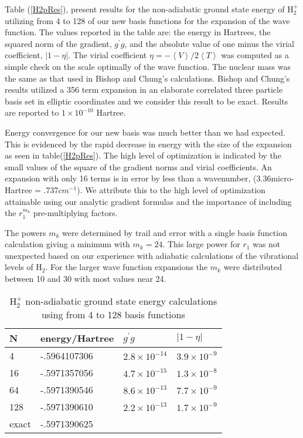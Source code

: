 \documentclass[12pt,doublespace]{article}
\begin{document}
Table (\ref{H2pRes}),  present results for the non-adiabatic ground state
energy of H$_{2}^{+}$ utilizing from 4 to 128 of our new basis functions for
the expansion of the wave function.  The values reported in the table are:
the energy in Hartrees, the squared norm of the gradient, $g^{\prime }g$,
and the absolute value of one minus the virial coefficient, $\left| 1-\eta
\right| $. The virial coefficient $\eta =-\left\langle V\right\rangle
/2\left\langle T\right\rangle $ was computed as a simple check on the scale
optimally of the wave function.  The nuclear mass was the same as that used
in Bishop and Chung's\cite{Bishop77} calculations. Bishop and Chung's
results utilized a 356 term expansion in an elaborate correlated three
particle basis set in elliptic coordinates and we consider this result to be
exact. Results are reported to $1\times 10^{-10}$ Hartree.

Energy convergence for our new basis was much better than we had expected.
This is evidenced by the rapid decrease in energy with the size of the
expansion as seen in table(\ref{H2pRes}). The high level of optimization is
indicated by the small values of the square of the gradient norms and virial
coefficients.  An expansion with only 16 terms is in error by less than a
wavenumber, (3.36micro-Hartree = .737$cm^{-1}$). We attribute this to the
high level of optimization attainable using our analytic gradient formulas
and the importance of including the $r_{1}^{m_{k}}$ pre-multiplying factors. 

The  powers $m_{k}$ were determined by trail and error with a single basis
function calculation giving a minimum with $m_{k}=2\dot{4}$. This large
power for $r_{1}$ was not unexpected based on our experience with adiabatic
calculations of the vibrational levels of H$_{2}$\cite{Kinghorn95}. For the
larger wave function expansions the $m_{k}$ were distributed between 10 and
30 with most values near 24.  

\begin{table}[p] \centering%
%
\begin{tabular}{llll}
\hline\hline
N & energy/Hartree & $g^{\prime }g$ & $\left| 1-\eta \right| $ \\ \hline
4 & -.5964107306 & $2.8\times 10^{-14}$ & $3.9\times 10^{-9}$ \\ 
16 & -.5971357056 & $4.7\times 10^{-15}$ & $1.3\times 10^{-8}$ \\ 
64 & -.5971390546 & $8.6\times 10^{-13}$ & $7.7\times 10^{-9}$ \\ 
128 & -.5971390610 & $2.2\times 10^{-13}$ & $1.7\times 10^{-9}$ \\ 
exact\cite{Bishop77} & -.5971390625 &  &  \\ \hline\hline
\end{tabular}
\caption{H$_{2}^{+}$  non-adiabatic ground state energy calculations using from 4 to 128 basis functions
      }%
\end{table}%
%
\end{document}
